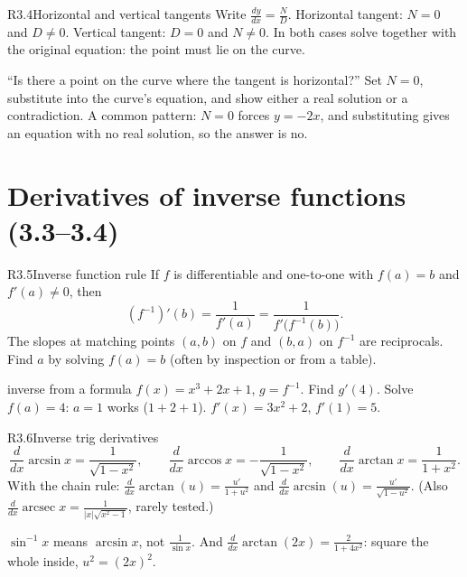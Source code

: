 \documentclass{apcalc}
\begin{document}
\begin{rulebox}{R3.4}{Horizontal and vertical tangents}
Write $\frac{dy}{dx}=\frac{N}{D}$. Horizontal tangent: $N=0$ and $D\neq0$. Vertical tangent: $D=0$ and $N\neq0$. In both cases solve together with the original equation: the point must lie on the curve.
\end{rulebox}

\begin{frqtip}
``Is there a point on the curve where the tangent is horizontal?'' Set $N=0$, substitute into the curve's equation, and show either a real solution or a contradiction. A common pattern: $N=0$ forces $y=-2x$, and substituting gives an equation with no real solution, so the answer is no.
\end{frqtip}

\section{Derivatives of inverse functions (3.3--3.4)}

\begin{rulebox}{R3.5}{Inverse function rule}
If $f$ is differentiable and one-to-one with $f(a)=b$ and $f'(a)\neq0$, then
\[(f^{-1})'(b)=\frac{1}{f'(a)}=\frac{1}{f'\big(f^{-1}(b)\big)}.\]
The slopes at matching points $(a,b)$ on $f$ and $(b,a)$ on $f^{-1}$ are reciprocals. Find $a$ by solving $f(a)=b$ (often by inspection or from a table).
\end{rulebox}

\begin{example}{inverse from a formula}
$f(x)=x^3+2x+1$, $g=f^{-1}$. Find $g'(4)$. Solve $f(a)=4$: $a=1$ works ($1+2+1$). $f'(x)=3x^2+2$, $f'(1)=5$. 
\end{example}

\begin{rulebox}{R3.6}{Inverse trig derivatives}
\[\frac{d}{dx}\arcsin x=\frac{1}{\sqrt{1-x^2}},\qquad \frac{d}{dx}\arccos x=-\frac{1}{\sqrt{1-x^2}},\qquad \frac{d}{dx}\arctan x=\frac{1}{1+x^2}.\]
With the chain rule: $\frac{d}{dx}\arctan(u)=\frac{u'}{1+u^2}$ and $\frac{d}{dx}\arcsin(u)=\frac{u'}{\sqrt{1-u^2}}$. (Also $\frac{d}{dx}\operatorname{arcsec}x=\frac{1}{|x|\sqrt{x^2-1}}$, rarely tested.)
\end{rulebox}

\begin{trap}
$\sin^{-1}x$ means $\arcsin x$, not $\frac{1}{\sin x}$. And $\frac{d}{dx}\arctan(2x)=\frac{2}{1+4x^2}$: square the whole inside, $u^2=(2x)^2$.
\end{trap}
\end{document}
